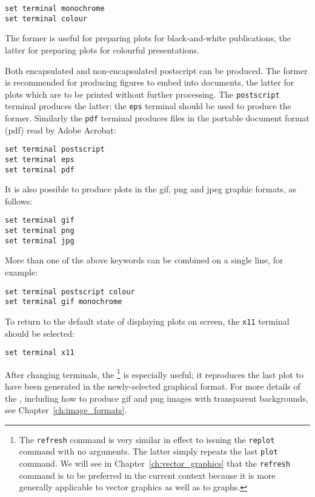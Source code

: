 \begin{verbatim}
set terminal monochrome
set terminal colour
\end{verbatim}

\noindent The former is useful for preparing plots for black-and-white
publications, the latter for preparing plots for colourful presentations.

Both encapsulated and non-encapsulated postscript can be produced. The former
is recommended for producing figures to embed into documents, the latter for
plots which are to be printed without further processing. The
{\tt postscript} terminal produces the latter; the {\tt eps} terminal
should be used to produce the former.  Similarly the {\tt pdf} terminal
produces files in the portable document format (pdf) read by
Adobe Acrobat:

\begin{verbatim}
set terminal postscript
set terminal eps
set terminal pdf
\end{verbatim}

It is also possible to produce plots in the gif, png and jpeg graphic formats,
as follows:

\begin{verbatim}
set terminal gif
set terminal png
set terminal jpg
\end{verbatim}

More than one of the above keywords can be combined on a single line, for
example:

\begin{verbatim}
set terminal postscript colour
set terminal gif monochrome
\end{verbatim}

To return to the default state of displaying plots on screen, the {\tt x11}
terminal should be selected:

\begin{verbatim}
set terminal x11
\end{verbatim}

After changing terminals, the \footnote{The {\tt refresh}
command is very similar in effect to issuing the {\tt replot} command with no
arguments. The latter simply repeats the last {\tt plot} command. We will see
in Chapter~\ref{ch:vector_graphics} that the {\tt refresh} command is to be
preferred in the current context because it is more generally applicable to
vector graphics as well as to graphs.} is especially useful; it reproduces  the
last plot to have been generated in the newly-selected graphical format.  For
more details of the , including how to produce gif and
png images with transparent backgrounds, see Chapter~\ref{ch:image_formats}.

